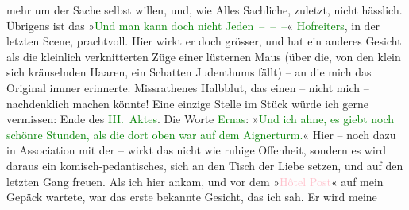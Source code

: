                mehr um der Sache selbst willen, und, wie Alles Sachliche, zuletzt, nicht
               hässlich.\pend
           \pstart
           Übrigens ist das »\textcolor{green}{Und man {\pb}kann doch nicht
               Jeden – – –}{}« \textcolor{green}{Hofreiters}{}, in
               der letzten Scene, prachtvoll. Hier wirkt er doch grösser, und hat ein anderes
               Gesicht als die kleinlich verknitterten Züge einer lüsternen Maus (über die, von den
               klein sich kräuselnden Haaren, ein Schatten Judenthums fällt) – an die mich das
               Original immer erinnerte.\pend
           \pstart
           Missrathenes Halbblut, das einen – nicht mich – nachdenklich machen könnte!\pend
           \pstart
           Eine einzige Stelle im Stück würde ich gerne vermissen: Ende des \textcolor{green}{III. Aktes}{}. Die Worte \textcolor{green}{Ernas}{}: »\textcolor{green}{Und ich ahne, es giebt noch schönre Stunden, als die dort oben
                  war auf dem Aignerturm.}{}«\pend
           \pstart
           Hier – noch dazu in Association mit der \label{K_L01942-5v}\label{K_L01942-5h} – wirkt das nicht wie ruhige Offenheit, sondern es wird daraus ein
               komisch-pedantisches, sich an den Tisch der Liebe setzen, und auf den letzten Gang
               freuen.\pend
           \pstart
           {\pb}Als ich hier ankam, und vor dem
                  »\textcolor{pink}{Hôtel Post}{}\ledrightnote{\textcolor{pink}{Hotel Post}}« auf mein Gepäck wartete, war
                  \label{K_L01942_2v}\label{K_L01942_2h} das erste bekannte Gesicht, das ich sah. Er wird meine
